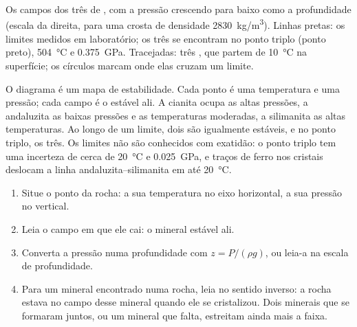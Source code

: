 \begin{omfigure}
{\small Os campos dos três  de , com a pressão
crescendo para baixo como a profundidade (escala da direita, para uma crosta
de densidade \qty{2830}{kg/m^3}). Linhas pretas: os limites medidos em
laboratório; os três se encontram no ponto triplo (ponto preto),
\qty{504}{\celsius} e \qty{0.375}{GPa}. Tracejadas: três , que
partem de \qty{10}{\celsius} na superfície; os círculos marcam onde elas
cruzam um limite.}
\end{omfigure}

O diagrama é um mapa de estabilidade. Cada ponto é uma temperatura e uma
pressão; cada campo é o  estável ali. A cianita ocupa as altas
pressões, a andaluzita as baixas pressões e as temperaturas moderadas, a
silimanita as altas temperaturas. Ao longo de um limite, dois  são
igualmente estáveis, e no ponto triplo, os três. Os limites não são
conhecidos com exatidão: o ponto triplo tem uma incerteza de cerca de
\qty{20}{\celsius} e \qty{0.025}{GPa}, e traços de ferro nos cristais
deslocam a linha andaluzita--silimanita em até \qty{20}{\celsius}.

\begin{method}\label{met:g12:metamorphic-rocks:pt}
\begin{enumerate}
  \item Situe o ponto da rocha: a sua temperatura no eixo horizontal, a sua
        pressão no vertical.
  \item Leia o campo em que ele cai: o mineral estável ali.
  \item Converta a pressão numa profundidade com $z = P/(\rho g)$, ou leia-a
        na escala de profundidade.
  \item Para um mineral encontrado numa rocha, leia no sentido inverso: a
        rocha estava no campo desse mineral quando ele se cristalizou. Dois
        minerais que se formaram juntos, ou um mineral que falta, estreitam
        ainda mais a faixa.
\end{enumerate}
\end{method}

